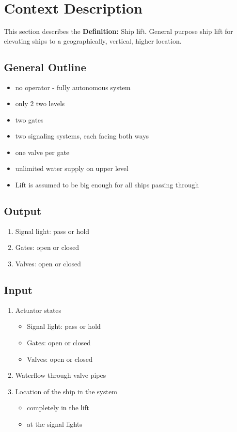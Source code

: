 
\section{Context Description}
This section describes the 
\textbf{Definition:}
Ship lift. General purpose ship lift for elevating ships to a geographically, vertical, higher location. \\
\subsection{General Outline}
\begin{itemize}
	\item no operator - fully autonomous system
	\item only 2 two levels
	\item two gates
	\item two signaling systems, each facing both ways
	\item one valve per gate
	\item unlimited water supply on upper level
	\item Lift is assumed to be big enough for all ships passing through
\end{itemize}
\pagebreak

\subsection{Output}
\begin{enumerate}
	\item Signal light: pass or hold
	\item Gates: open or closed
	\item Valves: open or closed
\end{enumerate}

\subsection{Input}
\begin{enumerate}
	\item Actuator states
	\begin{itemize}
		\item Signal light: pass or hold
		\item Gates: open or closed
		\item Valves: open or closed
	\end{itemize}
	\item Waterflow through valve pipes
	\item Location of the ship in the system
	\begin{itemize}
		\item completely in the lift
		\item at the signal lights
	\end{itemize}
\end{enumerate}